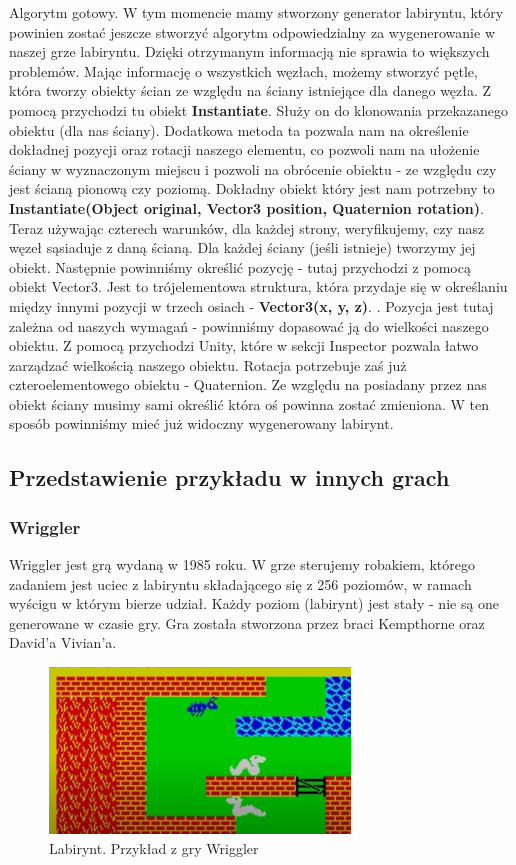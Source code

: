 \documentclass[oneside,polski,logo]{amuthesis}
\begin{document}
Algorytm gotowy. W tym momencie mamy stworzony generator labiryntu, który powinien zostać jeszcze stworzyć algorytm odpowiedzialny za wygenerowanie w naszej grze labiryntu. Dzięki otrzymanym informacją nie sprawia to większych problemów. Mając informację o wszystkich węzłach, możemy stworzyć pętle, która tworzy obiekty ścian ze względu na ściany istniejące dla danego węzła. Z pomocą przychodzi tu obiekt \textbf{Instantiate}. Służy on do klonowania przekazanego obiektu (dla nas ściany). Dodatkowa metoda ta pozwala nam na określenie dokładnej pozycji oraz rotacji naszego elementu, co pozwoli nam na ułożenie ściany w wyznaczonym miejscu i pozwoli na obrócenie obiektu - ze względu czy jest ścianą pionową czy poziomą. Dokładny obiekt który jest nam potrzebny to \textbf{Instantiate(Object original, Vector3 position, Quaternion rotation)}. \cite{Instantiate}
Teraz używając czterech warunków, dla każdej strony, weryfikujemy, czy nasz węzeł sąsiaduje z daną ścianą. Dla każdej ściany (jeśli istnieje) tworzymy jej obiekt. Następnie powinniśmy określić pozycję - tutaj przychodzi z pomocą obiekt Vector3. Jest to trójelementowa struktura, która przydaje się w określaniu między innymi pozycji w trzech osiach - \textbf{Vector3(x, y, z)}. \cite{Vector3}. Pozycja jest tutaj zależna od naszych wymagań - powinniśmy dopasować ją do wielkości naszego obiektu. Z pomocą przychodzi Unity, które w sekcji Inspector pozwala łatwo zarządzać wielkością naszego obiektu. Rotacja potrzebuje zaś już czteroelementowego obiektu - Quaternion. Ze względu na posiadany przez nas obiekt ściany musimy sami określić która oś powinna zostać zmieniona. W ten sposób powinniśmy mieć już widoczny wygenerowany labirynt.


\subsection{Przedstawienie przykładu w innych grach}
\subsubsection{Wriggler}
Wriggler jest grą wydaną w 1985 roku. W grze sterujemy robakiem, którego zadaniem jest uciec z labiryntu składającego się z 256 poziomów, w ramach wyścigu w którym bierze udział. Każdy poziom (labirynt) jest stały - nie są one generowane w czasie gry. Gra została stworzona przez braci Kempthorne oraz David'a Vivian'a. \cite{Wriggler}

\begin{figure}
	\centering
	\includegraphics[width=8cm]{images/tyrek/wriggler.png}
	\caption{Labirynt. Przykład z gry Wriggler}
\end{figure}
\end{document}
